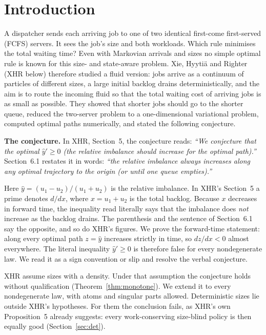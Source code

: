 \documentclass[11pt]{article}
\numberwithin{equation}{section}
\theoremstyle{definition}
\theoremstyle{remark}
\begin{document}
\section{Introduction}\label{sec:intro}

A dispatcher sends each arriving job to one of two identical first-come first-served (FCFS) servers. It sees the job's size and both workloads. Which rule minimises the total waiting time? Even with Markovian arrivals and sizes no simple optimal rule is known for this size- and state-aware problem. Xie, Hyyti\"a and Righter \cite{XHR2026} (XHR below) therefore studied a fluid version: jobs arrive as a continuum of particles of different sizes, a large initial backlog drains deterministically, and the aim is to route the incoming fluid so that the total waiting cost of arriving jobs is as small as possible. They showed that shorter jobs should go to the shorter queue, reduced the two-server problem to a one-dimensional variational problem, computed optimal paths numerically, and stated the following conjecture.

\begin{framed}
\noindent\textbf{The conjecture.} In XHR, Section~5, the conjecture reads: \emph{``We conjecture that the optimal $\hat y'\ge0$ (the relative imbalance should increase for the optimal path).''} Section~6.1 restates it in words: \emph{``the relative imbalance always increases along any optimal trajectory to the origin (or until one queue empties).''}
\end{framed}

\noindent Here $\hat y=(u_1-u_2)/(u_1+u_2)$ is the relative imbalance. In XHR's Section~5 a prime denotes $d/dx$, where $x=u_1+u_2$ is the total backlog. Because $x$ decreases in forward time, the inequality read literally says that the imbalance does \emph{not} increase as the backlog drains. The parenthesis and the sentence of Section~6.1 say the opposite, and so do XHR's figures. We prove the forward-time statement: along every optimal path $z=\hat y$ increases strictly in time, so $dz/dx<0$ almost everywhere. The literal inequality $\hat y'\ge0$ is therefore false for every nondegenerate law. We read it as a sign convention or slip and resolve the verbal conjecture.

XHR assume sizes with a density. Under that assumption the conjecture holds without qualification (Theorem~\ref{thm:monotone}). We extend it to every nondegenerate law, with atoms and singular parts allowed. Deterministic sizes lie outside XHR's hypotheses. For them the conclusion fails, as XHR's own Proposition~5 already suggests: every work-conserving size-blind policy is then equally good (Section~\ref{sec:det}).
\end{document}
